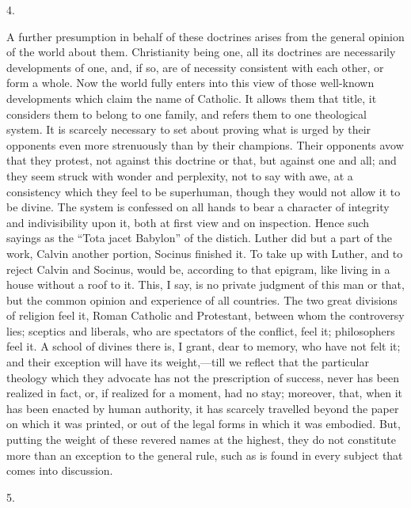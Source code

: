 4.

A further presumption in behalf of these doctrines
arises from the general opinion of the world about them.
Christianity being one, all its doctrines are necessarily
developments of one, and, if so, are of necessity
consistent with each other, or form a whole. Now the
world fully enters into this view of those well-known
developments which claim the name of Catholic. It allows
them that title, it considers them to belong to one
family, and refers them to one theological system. It is
scarcely necessary to set about proving what is urged by
their opponents even more strenuously than by their
champions. Their opponents avow that they protest, not
against this doctrine or that, but against one and all;
and they seem struck with wonder and perplexity, not to
say with awe, at a consistency which they feel to be
superhuman, though they would not allow it to be divine.
The system is confessed on all hands to bear a character
of integrity and indivisibility upon it, both at first
view and on inspection. Hence such sayings as the
``Tota jacet Babylon'' of the distich. Luther did
but a part of the work, Calvin another portion, Socinus
finished it. To take up with Luther, and to reject Calvin
and Socinus, would be, according to that epigram, like
living in a house without a roof to it. This, I say, is no private judgment of this man or that, but the common
opinion and experience of all countries. The two great
divisions of religion feel it, Roman Catholic and
Protestant, between whom the controversy lies; sceptics
and liberals, who are spectators of the conflict, feel
it; philosophers feel it. A school of divines there is, I
grant, dear to memory, who have not felt it; and their
exception will have its weight,—till we reflect that
the particular theology which they advocate has not the
prescription of success, never has been realized in fact,
or, if realized for a moment, had no stay; moreover,
that, when it has been enacted by human authority, it has
scarcely travelled beyond the paper on which it was
printed, or out of the legal forms in which it was
embodied. But, putting the weight of these revered names
at the highest, they do not constitute more than an
exception to the general rule, such as is found in every
subject that comes into discussion.

5.

